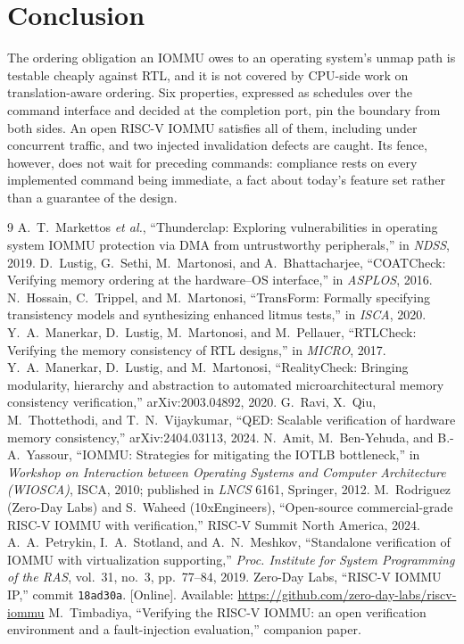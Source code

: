 \documentclass[conference]{IEEEtran}
\begin{document}
\section{Conclusion}
The ordering obligation an IOMMU owes to an operating system's unmap path is
testable cheaply against RTL, and it is not covered by CPU-side work on
translation-aware ordering. Six properties, expressed as schedules over the
command interface and decided at the completion port, pin the boundary from both
sides. An open RISC-V IOMMU satisfies all of them, including under concurrent
traffic, and two injected invalidation defects are caught. Its fence, however,
does not wait for preceding commands: compliance rests on every implemented
command being immediate, a fact about today's feature set rather than a
guarantee of the design.

\begin{thebibliography}{9}
 A.~T.~Markettos \emph{et al.}, ``Thunderclap: Exploring
vulnerabilities in operating system IOMMU protection via DMA from untrustworthy
peripherals,'' in \emph{NDSS}, 2019.
 D.~Lustig, G.~Sethi, M.~Martonosi, and A.~Bhattacharjee,
``COATCheck: Verifying memory ordering at the hardware--OS interface,'' in
\emph{ASPLOS}, 2016.
 N.~Hossain, C.~Trippel, and M.~Martonosi,
``TransForm: Formally specifying transistency models and synthesizing enhanced
litmus tests,'' in \emph{ISCA}, 2020.
 Y.~A.~Manerkar, D.~Lustig, M.~Martonosi, and M.~Pellauer,
``RTLCheck: Verifying the memory consistency of RTL designs,'' in \emph{MICRO},
2017.
 Y.~A.~Manerkar, D.~Lustig, and M.~Martonosi,
``RealityCheck: Bringing modularity, hierarchy and abstraction to automated
microarchitectural memory consistency verification,'' arXiv:2003.04892, 2020.
 G.~Ravi, X.~Qiu, M.~Thottethodi, and T.~N.~Vijaykumar,
``QED: Scalable verification of hardware memory consistency,''
arXiv:2404.03113, 2024.
 N.~Amit, M.~Ben-Yehuda, and B.-A.~Yassour, ``IOMMU: Strategies
for mitigating the IOTLB bottleneck,'' in \emph{Workshop on Interaction between
Operating Systems and Computer Architecture (WIOSCA)}, ISCA, 2010; published in
\emph{LNCS} 6161, Springer, 2012.
 M.~Rodriguez (Zero-Day Labs) and S.~Waheed (10xEngineers),
``Open-source commercial-grade RISC-V IOMMU with verification,'' RISC-V Summit
North America, 2024.
 A.~A.~Petrykin, I.~A.~Stotland, and A.~N.~Meshkov, ``Standalone
verification of IOMMU with virtualization supporting,'' \emph{Proc. Institute
for System Programming of the RAS}, vol.~31, no.~3, pp.~77--84, 2019.
 Zero-Day Labs, ``RISC-V IOMMU IP,'' commit \texttt{18ad30a}.
[Online]. Available: \url{https://github.com/zero-day-labs/riscv-iommu}
 M.~Timbadiya, ``Verifying the RISC-V IOMMU: an open
verification environment and a fault-injection evaluation,'' companion paper.
\end{thebibliography}
\end{document}
